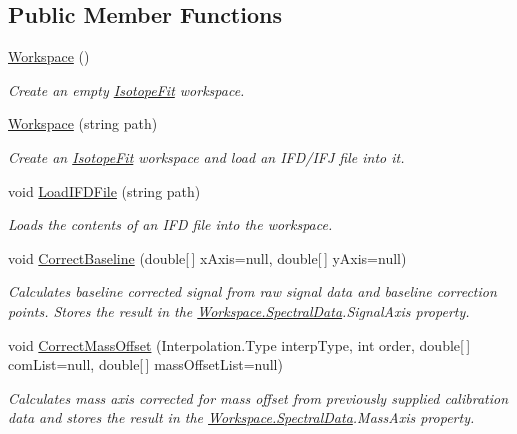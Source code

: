 \subsection*{Public Member Functions}
\begin{DoxyCompactItemize}
\item 
\hyperlink{class_isotope_fit_1_1_workspace_affa8b6ac937cee367c225c606782da17}{Workspace} ()
\begin{DoxyCompactList}\small\item\em Create an empty \hyperlink{namespace_isotope_fit}{Isotope\+Fit} workspace. \end{DoxyCompactList}\item 
\hyperlink{class_isotope_fit_1_1_workspace_a5aa1f6546513d331f262d383fe6b0358}{Workspace} (string path)
\begin{DoxyCompactList}\small\item\em Create an \hyperlink{namespace_isotope_fit}{Isotope\+Fit} workspace and load an I\+F\+D/\+I\+FJ file into it. \end{DoxyCompactList}\item 
void \hyperlink{class_isotope_fit_1_1_workspace_a55061c1f05d3e02d2d591fe6211d2f1f}{Load\+I\+F\+D\+File} (string path)
\begin{DoxyCompactList}\small\item\em Loads the contents of an I\+FD file into the workspace. \end{DoxyCompactList}\item 
void \hyperlink{class_isotope_fit_1_1_workspace_aa0b81213937d49ae3a6183563cfe0f60}{Correct\+Baseline} (double\mbox{[}$\,$\mbox{]} x\+Axis=null, double\mbox{[}$\,$\mbox{]} y\+Axis=null)
\begin{DoxyCompactList}\small\item\em Calculates baseline corrected signal from raw signal data and baseline correction points. Stores the result in the \hyperlink{class_isotope_fit_1_1_workspace_a1d6cc2dd07cbfe920da9f1bffc9b32c2}{Workspace.\+Spectral\+Data}.Signal\+Axis property. \end{DoxyCompactList}\item 
void \hyperlink{class_isotope_fit_1_1_workspace_afcb232ba4ab41a8809afdb8c1c3844f3}{Correct\+Mass\+Offset} (Interpolation.\+Type interp\+Type, int order, double\mbox{[}$\,$\mbox{]} com\+List=null, double\mbox{[}$\,$\mbox{]} mass\+Offset\+List=null)
\begin{DoxyCompactList}\small\item\em Calculates mass axis corrected for mass offset from previously supplied calibration data and stores the result in the \hyperlink{class_isotope_fit_1_1_workspace_a1d6cc2dd07cbfe920da9f1bffc9b32c2}{Workspace.\+Spectral\+Data}.Mass\+Axis property. \end{DoxyCompactList}\item 

\end{DoxyCompactItemize}
